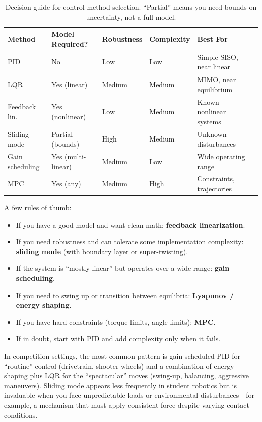 \begin{table}[H]
\centering
\begin{tabular}{@{}llllll@{}}
\toprule
\textbf{Method} & \textbf{Model Required?} & \textbf{Robustness} & \textbf{Complexity} & \textbf{Best For} \\
\midrule
PID & No & Low & Low & Simple SISO, near linear \\
LQR & Yes (linear) & Medium & Medium & MIMO, near equilibrium \\
Feedback lin. & Yes (nonlinear) & Low & Medium & Known nonlinear systems \\
Sliding mode & Partial (bounds) & High & Medium & Unknown disturbances \\
Gain scheduling & Yes (multi-linear) & Medium & Low & Wide operating range \\
MPC & Yes (any) & Medium & High & Constraints, trajectories \\
\bottomrule
\end{tabular}
\caption{Decision guide for control method selection. ``Partial'' means you need bounds on uncertainty, not a full model.}
\end{table}

A few rules of thumb:
\begin{itemize}[nosep]
    \item If you have a good model and want clean math: \textbf{feedback linearization}.
    \item If you need robustness and can tolerate some implementation complexity: \textbf{sliding mode} (with boundary layer or super-twisting).
    \item If the system is ``mostly linear'' but operates over a wide range: \textbf{gain scheduling}.
    \item If you need to swing up or transition between equilibria: \textbf{Lyapunov / energy shaping}.
    \item If you have hard constraints (torque limits, angle limits): \textbf{MPC}.
    \item If in doubt, start with PID and add complexity only when it fails.
\end{itemize}

In competition settings, the most common pattern is gain-scheduled PID for ``routine'' control (drivetrain, shooter wheels) and a combination of energy shaping plus LQR for the ``spectacular'' moves (swing-up, balancing, aggressive maneuvers). Sliding mode appears less frequently in student robotics but is invaluable when you face unpredictable loads or environmental disturbances---for example, a mechanism that must apply consistent force despite varying contact conditions.

